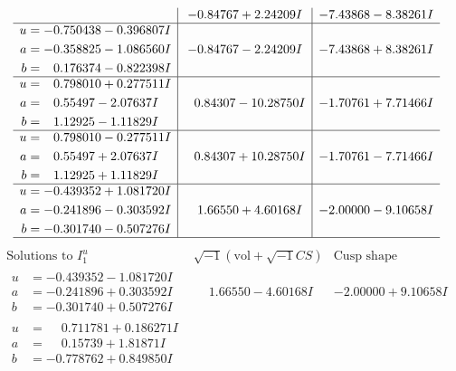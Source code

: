 \documentclass[1p]{elsarticle_modified}
\theoremstyle{definition}
\newcommand{\I}{\sqrt{-1}}
\begin{document}
$$\begin{array}{c|c|c}
 & -0.84767 + 2.24209 I & -7.43868 - 8.38261 I \\ \hline\begin{aligned}
u &= -0.750438 - 0.396807 I \\
a &= -0.358825 - 1.086560 I \\
b &= \phantom{-}0.176374 - 0.822398 I\end{aligned}
 & -0.84767 - 2.24209 I & -7.43868 + 8.38261 I \\ \hline\begin{aligned}
u &= \phantom{-}0.798010 + 0.277511 I \\
a &= \phantom{-}0.55497 - 2.07637 I \\
b &= \phantom{-}1.12925 - 1.11829 I\end{aligned}
 & \phantom{-}0.84307 - 10.28750 I & -1.70761 + 7.71466 I \\ \hline\begin{aligned}
u &= \phantom{-}0.798010 - 0.277511 I \\
a &= \phantom{-}0.55497 + 2.07637 I \\
b &= \phantom{-}1.12925 + 1.11829 I\end{aligned}
 & \phantom{-}0.84307 + 10.28750 I & -1.70761 - 7.71466 I \\ \hline\begin{aligned}
u &= -0.439352 + 1.081720 I \\
a &= -0.241896 - 0.303592 I \\
b &= -0.301740 - 0.507276 I\end{aligned}
 & \phantom{-}1.66550 + 4.60168 I & -2.00000 - 9.10658 I\\
 \hline 
 \end{array}$$\newpage$$\begin{array}{c|c|c}  
\text{Solutions to }I^u_{1}& \I (\text{vol} + \sqrt{-1}CS) & \text{Cusp shape}\\
 \hline 
\begin{aligned}
u &= -0.439352 - 1.081720 I \\
a &= -0.241896 + 0.303592 I \\
b &= -0.301740 + 0.507276 I\end{aligned}
 & \phantom{-}1.66550 - 4.60168 I & -2.00000 + 9.10658 I \\ \hline\begin{aligned}
u &= \phantom{-}0.711781 + 0.186271 I \\
a &= \phantom{-}0.15739 + 1.81871 I \\
b &= -0.778762 + 0.849850 I\end{aligned}

\end{array}$$
\end{document}
